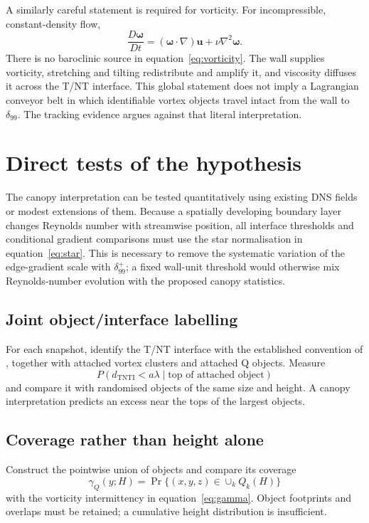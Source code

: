 \documentclass[11pt]{article}
\begin{document}
A similarly careful statement is required for vorticity.  For incompressible, constant-density flow,
\begin{equation}
 \frac{D\bm{\omega}}{Dt}
 = (\bm{\omega}\!\cdot\!\nabla)\bm{u}+\nu\nabla^2\bm{\omega}.
 \label{eq:vorticity}
\end{equation}
There is no baroclinic source in equation~\eqref{eq:vorticity}.  The wall supplies vorticity, stretching and tilting redistribute and amplify it, and viscosity diffuses it across the T/NT interface.  This global statement does not imply a Lagrangian conveyor belt in which identifiable vortex objects travel intact from the wall to $\delta_{99}$.  The tracking evidence argues against that literal interpretation.

\FloatBarrier
\section{Direct tests of the hypothesis}

The canopy interpretation can be tested quantitatively using existing DNS fields or modest extensions of them. Because a spatially developing boundary layer changes Reynolds number with streamwise position, all interface thresholds and conditional gradient comparisons must use the star normalisation in equation~\eqref{eq:star}. This is necessary to remove the systematic variation of the edge-gradient scale with $\delta_{99}^+$; a fixed wall-unit threshold would otherwise mix Reynolds-number evolution with the proposed canopy statistics.

\subsection{Joint object/interface labelling}
For each snapshot, identify the T/NT interface with the established convention of \citet{BorrellJimenez2016}, together with attached vortex clusters and attached Q objects.  Measure
\begin{equation}
 P\!\left(d_{\mathrm{TNTI}}<a\lambda\mid\text{top of attached object}\right)
\end{equation}
and compare it with randomised objects of the same size and height. A canopy interpretation predicts an excess near the tops of the largest objects.

\subsection{Coverage rather than height alone}
Construct the pointwise union of objects and compare its coverage
\begin{equation}
 \gamma_Q(y;H)=\Pr\{(x,y,z)\in\cup_k Q_k(H)\}
\end{equation}
with the vorticity intermittency in equation~\eqref{eq:gamma}.  Object footprints and overlaps must be retained; a cumulative height distribution is insufficient.
\end{document}
